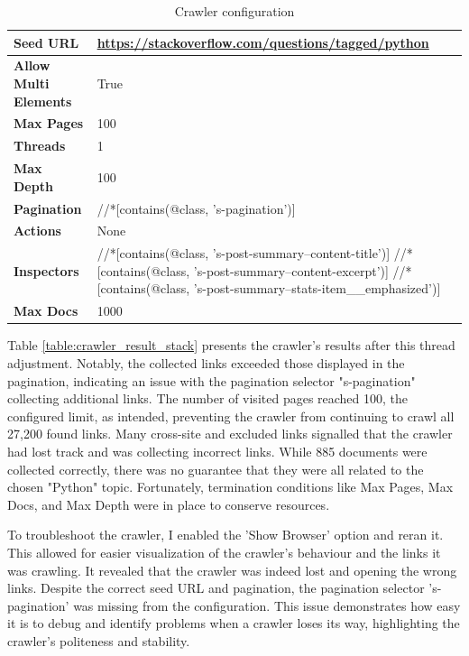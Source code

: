 {\begin{table}[ht] 
{\footnotesize
\begin{tabular}{ P{3cm} ||P{10.1cm}  }      %
 \hline \hline
\textbf{Seed URL} & \href{https://stackoverflow.com/questions/tagged/python}{https://stackoverflow.com/questions/tagged/python}\T\B 
\\ 
\hline
\textbf{Allow Multi Elements} & True \T\B 
\\ 
\hline
\textbf{Max Pages} & 100\T\B 
\\ 
\hline
\textbf{Threads} & 1\T\B 
\\ 
\hline
\textbf{Max Depth} & 100\T\B 
\\ 
\hline
\textbf{Pagination} & //*[contains(@class, 's-pagination')]\T\B 
\\ 
\hline
\textbf{Actions} & None\T\B 
\\ 
\hline
\textbf{Inspectors} & //*[contains(@class, 's-post-summary--content-title')]\T\B  \newline
//*[contains(@class, 's-post-summary--content-excerpt')]	
 \newline
//*[contains(@class, 's-post-summary--stats-item\_\_emphasized')]	
\\ 
\hline
\textbf{Max Docs} & 1000\T\B 
\\ 
\hline \hline
    \end{tabular}
}
  \captionsetup{justification=centering,margin=2cm}
  \caption{Crawler configuration}
\end{table}


Table \ref{table:crawler_result_stack} presents the crawler's results after this thread adjustment. Notably, the collected links exceeded those displayed in the pagination, indicating an issue with the pagination selector "s-pagination" collecting additional links. The number of visited pages reached 100, the configured limit, as intended, preventing the crawler from continuing to crawl all 27,200 found links. Many cross-site and excluded links signalled that the crawler had lost track and was collecting incorrect links. While 885 documents were collected correctly, there was no guarantee that they were all related to the chosen "Python" topic. Fortunately, termination conditions like Max Pages, Max Docs, and Max Depth were in place to conserve resources.

To troubleshoot the crawler, I enabled the 'Show Browser' option and reran it. This allowed for easier visualization of the crawler's behaviour and the links it was crawling. It revealed that the crawler was indeed lost and opening the wrong links. Despite the correct seed URL and pagination, the pagination selector 's-pagination' was missing from the configuration. This issue demonstrates how easy it is to debug and identify problems when a crawler loses its way, highlighting the crawler's politeness and stability.


}
